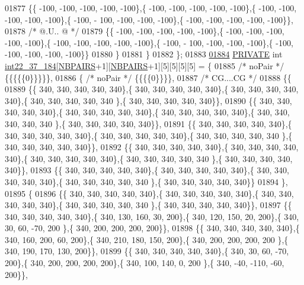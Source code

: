 \begin{DoxyCode}
01877 \{\{ -100, -100, -100, -100, -100\},\{ -100, -100, -100, -100, -100\},\{ -100, -100, -100, -100, -100\},\{ -100, -
      100, -100, -100, -100\},\{ -100, -100, -100, -100, -100\}\},
01878 \textcolor{comment}{/*  @.U.. @ */}
01879 \{\{ -100, -100, -100, -100, -100\},\{ -100, -100, -100, -100, -100\},\{ -100, -100, -100, -100, -100\},\{ -100, -
      100, -100, -100, -100\},\{ -100, -100, -100, -100, -100\}\}
01880 \}
01881 \}
01882 \};
01883 
\mbox{\hyperlink{1_88_84__intloops_8h_a22edece2c28eb118d2ba2f303c8f14cd}{01884}} \mbox{\hyperlink{edit__cost_8h_a5e151c615eda34903514212f05a5ccf8}{PRIVATE}} \textcolor{keywordtype}{int} \mbox{\hyperlink{1_88_84__intloops_8h_a22edece2c28eb118d2ba2f303c8f14cd}{int22\_37\_184}}[\mbox{\hyperlink{1_88_84__epars_8h_a5e75221c779d618eab81e096f37e32ce}{NBPAIRS}}+1][\mbox{\hyperlink{1_88_84__epars_8h_a5e75221c779d618eab81e096f37e32ce}{NBPAIRS}}+1][5][5][5][5] = \{
01885 \textcolor{comment}{/* noPair */} \{\{\{\{\{0\}\}\}\}\},
01886 \{ \textcolor{comment}{/* noPair */} \{\{\{\{0\}\}\}\},
01887 \textcolor{comment}{/* CG....CG */}
01888 \{\{
01889 \{\{ 340, 340, 340, 340, 340\},\{ 340, 340, 340, 340, 340\},\{ 340, 340, 340, 340, 340\},\{ 340, 340, 340, 340, 340
      \},\{ 340, 340, 340, 340, 340\}\},
01890 \{\{ 340, 340, 340, 340, 340\},\{ 340, 340, 340, 340, 340\},\{ 340, 340, 340, 340, 340\},\{ 340, 340, 340, 340, 340
      \},\{ 340, 340, 340, 340, 340\}\},
01891 \{\{ 340, 340, 340, 340, 340\},\{ 340, 340, 340, 340, 340\},\{ 340, 340, 340, 340, 340\},\{ 340, 340, 340, 340, 340
      \},\{ 340, 340, 340, 340, 340\}\},
01892 \{\{ 340, 340, 340, 340, 340\},\{ 340, 340, 340, 340, 340\},\{ 340, 340, 340, 340, 340\},\{ 340, 340, 340, 340, 340
      \},\{ 340, 340, 340, 340, 340\}\},
01893 \{\{ 340, 340, 340, 340, 340\},\{ 340, 340, 340, 340, 340\},\{ 340, 340, 340, 340, 340\},\{ 340, 340, 340, 340, 340
      \},\{ 340, 340, 340, 340, 340\}\}
01894 \},
01895 \{
01896 \{\{ 340, 340, 340, 340, 340\},\{ 340, 340, 340, 340, 340\},\{ 340, 340, 340, 340, 340\},\{ 340, 340, 340, 340, 340
      \},\{ 340, 340, 340, 340, 340\}\},
01897 \{\{ 340, 340, 340, 340, 340\},\{ 340, 130, 160,  30, 200\},\{ 340, 120, 150,  20, 200\},\{ 340,  30,  60, -70, 200
      \},\{ 340, 200, 200, 200, 200\}\},
01898 \{\{ 340, 340, 340, 340, 340\},\{ 340, 160, 200,  60, 200\},\{ 340, 210, 180, 150, 200\},\{ 340, 200, 200, 200, 200
      \},\{ 340, 190, 170, 130, 200\}\},
01899 \{\{ 340, 340, 340, 340, 340\},\{ 340,  30,  60, -70, 200\},\{ 340, 200, 200, 200, 200\},\{ 340, 100, 140,   0, 200
      \},\{ 340, -40, -110, -60, 200\}\},

\end{DoxyCode}
